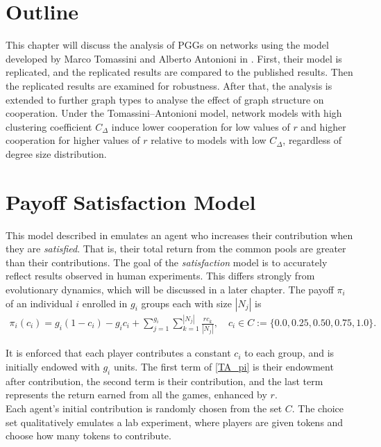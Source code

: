

\section{Outline}
This chapter will discuss the analysis of PGGs on networks using the model developed by Marco Tomassini and Alberto Antonioni in \cite{RN49}. First, their model is replicated, and the replicated results are compared to the published results. Then the replicated results are examined for robustness. After that, the analysis is extended to further graph types to analyse the effect of graph structure on cooperation. Under the Tomassini--Antonioni model, network models with high clustering coefficient $C_\Delta$ induce lower cooperation for low values of $r$ and higher cooperation for higher values of $r$ relative to models with low $C_\Delta$, regardless of degree size distribution. \\

\section{Payoff Satisfaction Model}
This model described in \cite{RN49} emulates an agent who increases their contribution when they are \emph{satisfied}. That is, their total return from the common pools are greater than their contributions. The goal of the \emph{satisfaction} model is to accurately reflect results observed in human experiments. This differs strongly from evolutionary dynamics, which will be discussed in a later chapter. The payoff $\pi_i$ of an individual $i$ enrolled in $g_i$ groups each with size $|N_j|$ is \\
\begin{align} \label{TA_pi}
    \pi_i(c_i) = g_i(1-c_i) - g_ic_i + \sum_{j=1}^{g_i} \sum_{k=1}^{|N_j|} \frac{rc_k}{|N_j|}, \quad c_i \in C:= \{0.0, 0.25, 0.50, 0.75, 1.0\}. 
\end{align}

It is enforced that each player contributes a constant $c_i$ to each group, and is initially endowed with $g_i$ units. The first term of \eqref{TA_pi} is their endowment after contribution, the second term is their contribution, and the last term represents the return earned from all the games, enhanced by $r$. \\

Each agent's initial contribution is randomly chosen from the set $C$. The choice set qualitatively emulates a lab experiment, where players are given tokens and choose how many tokens to contribute. \\

